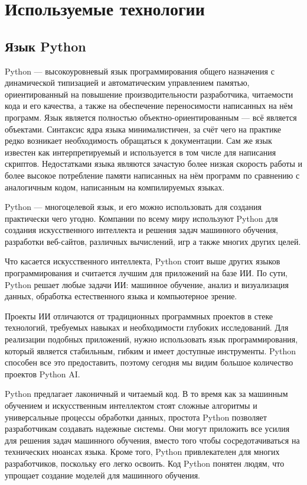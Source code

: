 \lstset{style=fsharpstyle}

\section{Используемые технологии} 
\label{sec:practice:technology_used}

\subsection{Язык Python}

Python — высокоуровневый язык программирования общего назначения с динамической типизацией и автоматическим управлением памятью, ориентированный на повышение производительности разработчика, читаемости кода и его качества, а также на обеспечение переносимости написанных на нём программ. Язык является полностью объектно-ориентированным --- всё является объектами. Синтаксис ядра языка минималистичен, за счёт чего на практике редко возникает необходимость обращаться к документации. Сам же язык известен как интерпретируемый и используется в том числе для написания скриптов. Недостатками языка являются зачастую более низкая скорость работы и более высокое потребление памяти написанных на нём программ по сравнению с аналогичным кодом, написанным на компилируемых языках. 

Python — многоцелевой язык, и его можно использовать для создания практически чего угодно. Компании по всему миру используют Python для создания искусственного интеллекта и решения задач машинного обучения, разработки веб-сайтов, различных вычислений, игр а также многих других целей.

Что касается искусственного интеллекта, Python стоит выше других языков программирования и считается лучшим для приложений на базе ИИ. По сути, Python решает любые задачи ИИ: машинное обучение, анализ и визуализация данных, обработка естественного языка и компьютерное зрение.

Проекты ИИ отличаются от традиционных программных проектов в стеке технологий, требуемых навыках и необходимости глубоких исследований. Для реализации подобных приложений, нужно использовать язык программирования, который является стабильным, гибким и имеет доступные инструменты. Python способен все это предоставить, поэтому сегодня мы видим большое количество проектов Python AI.

Python предлагает лаконичный и читаемый код. В то время как за машинным обучением и искусственным интеллектом стоят сложные алгоритмы и универсальные процессы обработки данных, простота Python позволяет разработчикам создавать надежные системы. Они могут приложить все усилия для решения задач машинного обучения, вместо того чтобы сосредотачиваться на технических нюансах языка. Кроме того, Python привлекателен для многих разработчиков, поскольку его легко освоить. Код Python понятен людям, что упрощает создание моделей для машинного обучения. \cite{python_for_ml}

